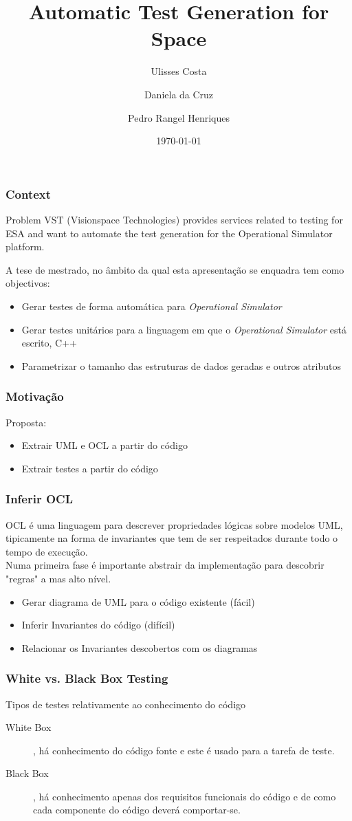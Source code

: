 \documentclass{beamer}
\title{Automatic Test Generation for Space}
\author{Ulisses Costa \and Daniela da Cruz \and Pedro Rangel Henriques}
\institute{SLATE'12 - Symposium on Languages, Applications and Technologies}
\date{\today}
\begin{document}
\begin{frame}
   \titlepage
\end{frame}

\begin{frame}\frametitle{Context}
\begin{block}{Problem}
VST (Visionspace Technologies) provides services related to testing for ESA and want to automate
the test generation for the Operational Simulator platform.
\end{block}

A tese de mestrado, no âmbito da qual esta apresentação se enquadra tem como objectivos:
\begin{itemize}
\item Gerar testes de forma automática para \textit{Operational Simulator}
\item Gerar testes unitários para a linguagem em que o \textit{Operational Simulator} está escrito, C++
\item Parametrizar o tamanho das estruturas de dados geradas e outros atributos
\end{itemize}
\end{frame}

\begin{frame}\frametitle{Motivação}
Proposta:
\begin{itemize}
\item Extrair UML e OCL a partir do código
\item Extrair testes a partir do código
\end{itemize}
\end{frame}

\begin{frame}\frametitle{Inferir OCL}
OCL é uma linguagem para descrever propriedades lógicas sobre modelos UML, tipicamente na forma de invariantes que tem de ser respeitados durante todo o tempo de execução.\\

Numa primeira fase é importante abstrair da implementação para descobrir "regras" a mas alto nível.
\begin{itemize}
\item Gerar diagrama de UML para o código existente (fácil)
\item Inferir Invariantes do código (difícil)
\item Relacionar os Invariantes descobertos com os diagramas
\end{itemize}
\end{frame}

\begin{frame}\frametitle{White vs. Black Box Testing}
\begin{block}{Tipos de testes relativamente ao conhecimento do código}
\begin{description}
\item[White Box], há conhecimento do código fonte e este é usado para a tarefa de teste.
\item[Black Box], há conhecimento apenas dos requisitos funcionais do código e de como cada componente do código deverá comportar-se.
\end{description}
\end{block}
\end{frame}
\end{document}
